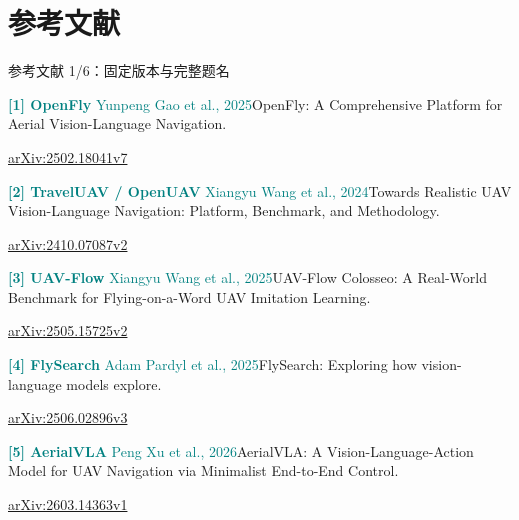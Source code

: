 \documentclass[aspectratio=169,10pt]{beamer}
\def\slidesource{}
\begin{document}
\section{参考文献}
\gdef\slidesource{\href{https://arxiv.org/html/2502.18041v7}{[1] OpenFly}；\href{https://arxiv.org/html/2410.07087v2}{[2] TravelUAV / OpenUAV}；\href{https://arxiv.org/html/2505.15725v2}{[3] UAV-Flow}；\href{https://arxiv.org/html/2506.02896v3}{[4] FlySearch}；\href{https://arxiv.org/html/2603.14363v1}{[5] AerialVLA}}
\begin{frame}[t,label=refs1]{参考文献 1/6：固定版本与完整题名}
\relax
{\fontsize{8.3}{10.6}\selectfont
\par\textcolor{teal}{\textbf{[1] OpenFly} Yunpeng Gao et al., 2025}\quad OpenFly: A Comprehensive Platform for Aerial Vision-Language Navigation.\par\href{https://arxiv.org/html/2502.18041v7}{arXiv:2502.18041v7}\par\vspace{1.8mm}
\par\textcolor{teal}{\textbf{[2] TravelUAV / OpenUAV} Xiangyu Wang et al., 2024}\quad Towards Realistic UAV Vision-Language Navigation: Platform, Benchmark, and Methodology.\par\href{https://arxiv.org/html/2410.07087v2}{arXiv:2410.07087v2}\par\vspace{1.8mm}
\par\textcolor{teal}{\textbf{[3] UAV-Flow} Xiangyu Wang et al., 2025}\quad UAV-Flow Colosseo: A Real-World Benchmark for Flying-on-a-Word UAV Imitation Learning.\par\href{https://arxiv.org/html/2505.15725v2}{arXiv:2505.15725v2}\par\vspace{1.8mm}
\par\textcolor{teal}{\textbf{[4] FlySearch} Adam Pardyl et al., 2025}\quad FlySearch: Exploring how vision-language models explore.\par\href{https://arxiv.org/html/2506.02896v3}{arXiv:2506.02896v3}\par\vspace{1.8mm}
\par\textcolor{teal}{\textbf{[5] AerialVLA} Peng Xu et al., 2026}\quad AerialVLA: A Vision-Language-Action Model for UAV Navigation via Minimalist End-to-End Control.\par\href{https://arxiv.org/html/2603.14363v1}{arXiv:2603.14363v1}\par\vspace{1.8mm}
}
\end{frame}
\end{document}
